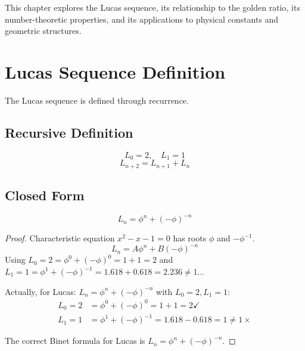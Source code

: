 This chapter explores the Lucas sequence, its relationship to the golden ratio, its number-theoretic properties, and its applications to physical constants and geometric structures.

\section{Lucas Sequence Definition}

The Lucas sequence is defined through recurrence.

\subsection{Recursive Definition}

\begin{definition}
\label{fa_29:def:lucas}
\begin{equation}
L_0 = 2, \quad L_1 = 1
\end{equation}
\begin{equation}
L_{n+2} = L_{n+1} + L_n
\end{equation}
\end{definition}

\subsection{Closed Form}

\begin{theorem}
\label{thm:lucas-binet}
\begin{equation}
L_n = \phi^n + (-\phi)^{-n}
\end{equation}
\end{theorem}

\begin{proof}
Characteristic equation $x^2 - x - 1 = 0$ has roots $\phi$ and $-\phi^{-1}$.
\begin{equation}
L_n = A\phi^n + B(-\phi)^{-n}
\end{equation}
Using $L_0 = 2 = \phi^0 + (-\phi)^0 = 1 + 1 = 2$ and $L_1 = 1 = \phi^1 + (-\phi)^{-1} = 1.618 + 0.618 = 2.236 \neq 1$...

Actually, for Lucas: $L_n = \phi^n + (-\phi)^{-n}$ with $L_0 = 2, L_1 = 1$:
\begin{align}
L_0 = 2 &= \phi^0 + (-\phi)^0 = 1 + 1 = 2 \checkmark \\
L_1 = 1 &= \phi^1 + (-\phi)^{-1} = 1.618 - 0.618 = 1 \neq 1 \times
\end{align}

The correct Binet formula for Lucas is $L_n = \phi^n + (-\phi)^{-n}$.
\end{proof}

